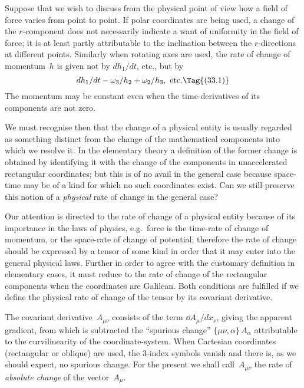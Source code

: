 \documentclass[12pt]{book}
\begin{document}

Suppose that we wish to discuss from the physical point of view how a
field of force varies from point to point. If polar coordinates are being used,
a change of the $r$-component does not necessarily indicate a want of uniformity
in the field of force; it is at least partly attributable to the inclination between
the $r$-directions at different points. Similarly when rotating axes are used,
the rate of change of momentum~$h$ is given not by $dh_{1}/dt$, etc., but by
\[
dh_{1}/dt - \omega_{3}/h_{2} + \omega_{2}/h_{3}, \text{ etc.}
\Tag{(33.1)}
\]
The momentum may be constant even when the time-derivatives of its components
are not zero.

We must recognise then that the change of a physical entity is usually
regarded as something distinct from the change of the mathematical components
into which we resolve it. In the elementary theory a definition of the
former change is obtained by identifying it with the change of the components
in unaccelerated rectangular coordinates; but this is of no avail in the general
case because space-time may be of a kind for which no such coordinates exist.
Can we still preserve this notion of a \emph{physical} rate of change in the general
case?

Our attention is directed to the rate of change of a physical entity because
of its importance in the laws of physics, e.g.\ force is the time-rate of change
of momentum, or the space-rate of change of potential; therefore the rate of
change should be expressed by a tensor of some kind in order that it may enter
into the general physical laws. Further in order to agree with the customary
definition in elementary cases, it must reduce to the rate of change of the
rectangular components when the coordinates are Galilean. Both conditions
are fulfilled if we define the physical rate of change of the tensor by its covariant
derivative.

The covariant derivative~$A_{\mu\nu}$ consists of the term $\dd A_{\mu}/dx_{\nu}$, giving the
apparent gradient, from which is subtracted the ``spurious change'' $\{\mu\nu, \alpha\}\, A_{\alpha}$
attributable to the curvilinearity of the coordinate-system. When Cartesian
coordinates (rectangular or oblique) are used, the $3$-index symbols vanish and
there is, as we should expect, no spurious change. For the present we shall
call~$A_{\mu\nu}$ the rate of \emph{absolute change} of the vector~$A_{\mu}$.
%
\end{document}
